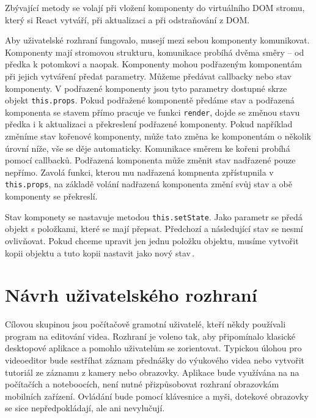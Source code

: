 Zbývající metody se volají při vložení komponenty do virtuálního DOM stromu, který si React vytváří, při aktualizaci a při odstraňování z DOM.

Aby uživatelské rozhraní fungovalo, musejí mezi sebou komponenty komunikovat. Komponenty mají stromovou strukturu, komunikace probíhá dvěma směry -- od předka k potomkovi a naopak. Komponenty mohou podřazeným komponentám při jejich vytváření předat parametry. Můžeme předávat callbacky nebo stav komponenty. V podřazené komponenty jsou tyto parametry dostupné skrze objekt \texttt{this.props}. Pokud podřažené komponentě předáme stav a podřazená komponenta se stavem přímo pracuje ve funkci \texttt{render}, dojde se změnou stavu předka i k aktualizaci a překreslení podřazené komponenty. Pokud například změníme stav kořenové komponenty, může tato změna  ke komponentám o několik úrovní níže, vše se děje automaticky. Komunikace směrem ke kořeni probíhá pomocí callbacků. Podřazená komponenta může změnit stav nadřazené pouze nepřímo. Zavolá funkci, kterou mu nadřazená kompnenta zpřístupnila v \texttt{this.props}, na základě volání nadřazená komponenta změní svůj stav a obě komponenty se překreslí.

Stav komponety se nastavuje metodou \texttt{this.setState}. Jako parametr se předá objekt s položkami, které se mají přepsat. Předchozí a následující stav se nesmí ovlivňovat. Pokud chceme upravit jen jednu položku objektu, musíme vytvořit kopii objektu a tuto kopii nastavit jako nový stav\,\cite{react}.

\section{Návrh uživatelského rozhraní}
Cílovou skupinou jsou počítačově gramotní uživatelé, kteří někdy používali program na editování videa. Rozhraní je voleno tak, aby připomínalo klasické desktopové aplikace a pomohlo uživatelům se zorientovat. Typickou úlohou pro videoeditor bude sestříhat záznam přednášky do výukového videa nebo vytvořit tutoriál ze záznamu z kamery nebo obrazovky. Aplikace bude využívána na na počítačích a noteboocích, není nutné přizpůsobovat rozhraní obrazovkám mobilních zařízení. Ovládání bude pomocí klávesnice a myši, dotekové obrazovky se sice nepředpokládají, ale ani nevylučují.

